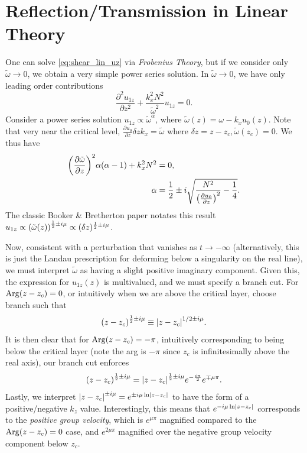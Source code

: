 \documentclass[11pt,
        usenames, %
        dvipsnames %
    ]{report}
\newcommand*{\pd}[2]{\frac{\partial#1}{\partial#2}}
\newcommand*{\ptd}[2]{\frac{\partial^2 #1}{\partial#2^2}}
\DeclareMathOperator{\Arg}{Arg}
\DeclarePairedDelimiter\abs{\lvert}{\rvert}
\DeclarePairedDelimiter\p{\lparen}{\rparen}
\begin{document}
\section{Reflection/Transmission in Linear Theory}

One can solve \autoref{eq:shear_lin_uz} via \emph{Frobenius Theory}, but if we
consider only $\tilde{\omega} \to 0$, we obtain a very simple power series
solution. In $\tilde{\omega} \to 0$, we have only leading order contributions
\begin{equation}
    \ptd{u_{1z}}{z} + \frac{k_x^2N^2}{\tilde{\omega}^2}u_{1z} = 0.
\end{equation}
Consider a power series solution $u_{1z} \propto \tilde{\omega}^\alpha$, where
$\tilde{\omega}(z) = \omega - k_xu_0(z)$. Note that very near the critical level,
$\pd{u_0}{z}\delta z k_x = \tilde{\omega}$ where $\delta z = z - z_c,
\tilde{\omega}(z_c) = 0$. We thus have
\begin{align}
    \p*{\pd{\tilde{\omega}}{z}}^2 \alpha\p*{\alpha - 1} + k_x^2N^2 &= 0,\\
    \alpha &= \frac{1}{2}\pm i\sqrt{\frac{N^2}{\p*{\pd{u_0}{z}}^2} -
        \frac{1}{4}}.
\end{align}
The classic Booker \& Bretherton paper notates this result $u_{1z} \propto
\p*{\tilde{\omega}(z)}^{\frac{1}{2} \pm i\mu} \propto (\delta z)^{\frac{1}{2} \pm
i\mu}$.

Now, consistent with a perturbation that vanishes as $t \to -\infty$
(alternatively, this is just the Landau prescription for deforming below a
singularity on the real line), we must interpret $\tilde{\omega}$ as having a
slight positive imaginary component. Given this, the expression for $u_{1z}(z)$
is multivalued, and we must specify a branch cut. For $\Arg\p*{z - z_c} = 0$, or
intuitively when we are above the critical layer, choose branch such that
\begin{equation}
    \p*{z - z_c}^{\frac{1}{2} \pm i\mu} \equiv
        \abs*{z - z_c}^{1/2\pm i\mu}.
\end{equation}
It is then clear that for $\Arg\p*{z - z_c} = -\pi$, intuitively corresponding
to being below the critical layer (note the arg is $-\pi$ since $z_c$ is
infinitesimally above the real axis), our branch cut enforces
\begin{equation}
    \p*{z - z_c}^{\frac{1}{2} \pm i\mu} =
        \abs*{z - z_c}^{\frac{1}{2} \pm i\mu}e^{-\frac{i\pi}{2}}e^{\mp \mu \pi}.
\end{equation}
Lastly, we interpret $\abs*{z - z_c}^{\pm i\mu} = e^{\pm i\mu \ln \abs*{z -
z_c}}$ to have the form of a positive/negative $k_z$ value. Interestingly, this
means that $e^{-i\mu \ln \abs*{z - z_c}}$ corresponds to the \emph{positive
group velocity}, which is $e^{\mu \pi}$ magnified compared to the $\Arg\p*{z -
z_c} = 0$ case, and $e^{2\mu \pi}$ magnified over the negative group velocity
component below $z_c$.
\end{document}
